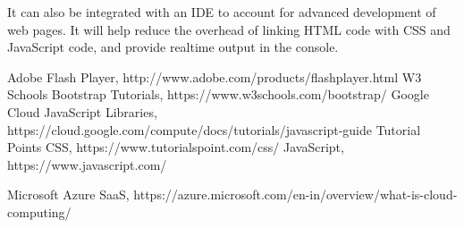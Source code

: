 \documentclass[12pt,a4paper]{article}
\begin{document}
It can also be integrated with an IDE to account for advanced development of web pages. It will help reduce the overhead of linking HTML code with CSS and JavaScript code, and provide realtime output in the console.
\newpage
\begin{thebibliography}{1}

   Adobe Flash Player, http://www.adobe.com/products/flashplayer.html
    W3 Schools Bootstrap Tutorials, https://www.w3schools.com/bootstrap/
   Google Cloud JavaScript Libraries, https://cloud.google.com/compute/docs/tutorials/javascript-guide
   Tutorial Points CSS, https://www.tutorialspoint.com/css/
   JavaScript, https://www.javascript.com/

   Microsoft Azure SaaS, https://azure.microsoft.com/en-in/overview/what-is-cloud-computing/



  \end{thebibliography}
\end{document}

